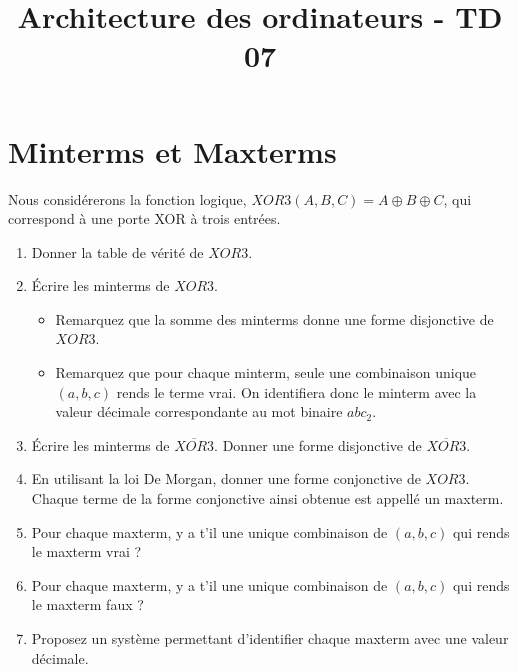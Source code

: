 \documentclass[a4paper,10pt]{exam}
\title{Architecture des ordinateurs - TD 07}
\author{}
\date{}
\begin{document}
\maketitle

\section{Minterms et Maxterms}
Nous considérerons la fonction logique, $XOR3(A,B,C) = A \oplus B \oplus C$, qui correspond à une porte XOR à trois entrées.
\begin{enumerate}
  \item Donner la table de vérité de $XOR3$.
  \item Écrire les minterms de $XOR3$.
      \begin{itemize}
        \item Remarquez que la somme des minterms donne une forme disjonctive de $XOR3$.
        \item Remarquez que pour chaque minterm, seule une combinaison unique $(a,b,c)$ rends le terme vrai.
              On identifiera donc le minterm avec la valeur décimale correspondante au mot binaire $abc_2$.
      \end{itemize}
  \item Écrire les minterms de $\overline{XOR3}$. Donner une forme disjonctive de $\overline{XOR3}$.
  \item En utilisant la loi De Morgan, donner une forme conjonctive de $XOR3$. Chaque terme de la forme conjonctive ainsi obtenue est appellé un maxterm.
  \item Pour chaque maxterm, y a t'il une unique combinaison de $(a,b,c)$ qui rends le maxterm vrai ?
  \item Pour chaque maxterm, y a t'il une unique combinaison de $(a,b,c)$ qui rends le maxterm faux ?
  \item Proposez un système permettant d'identifier chaque maxterm avec une valeur décimale.
\end{enumerate}
\end{document}
